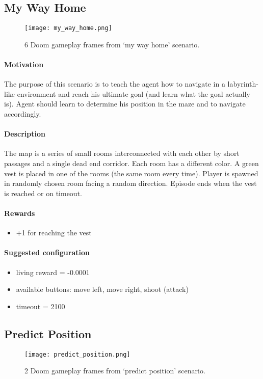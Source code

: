 	\subsection{My Way Home}
		\begin{figure}
			\centering
			\texttt{[image: my\_way\_home.png]}
			\caption{6 Doom gameplay frames from `my way home' scenario.}\label{fig:my_way_home}
		\end{figure}
		\paragraph{Motivation} 
			The purpose of this scenario is to teach the agent how to navigate in a labyrinth-like environment and reach his ultimate goal (and learn what the goal actually is). Agent should learn to determine his position in the maze and to navigate accordingly.

		\paragraph{Description}
			The map is a series of small rooms interconnected with each other by short passages and a single dead end corridor. Each room has a different color. A green vest is placed in one of the rooms (the same room every time). Player is spawned in randomly chosen room facing a random direction. Episode ends when the vest is reached or on timeout.
		\paragraph{Rewards}

		\begin{itemize}
			\item +1 for reaching the vest
		\end{itemize}
		
		\paragraph{Suggested configuration}
		\begin{itemize}
			\item living reward = -0.0001
			\item available buttons: move left, move right, shoot (attack)
			\item timeout = 2100
		\end{itemize}
	\newpage

	\subsection{Predict Position}
		\begin{figure}
			\centering
			\texttt{[image: predict\_position.png]}
			\caption{2 Doom gameplay frames from `predict position' scenario.}\label{fig:predict_position}
		\end{figure}

